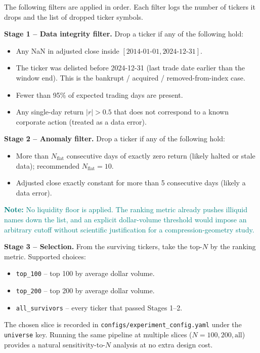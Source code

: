 \documentclass[11pt]{article}
\newcommand{\note}[1]{\textcolor{teal}{\textbf{Note:} #1}}
\begin{document}
The following filters are applied in order. Each filter logs the number of tickers it drops and the list of dropped ticker symbols.

\textbf{Stage 1 -- Data integrity filter.} Drop a ticker if any of the following hold:
\begin{itemize}
    \item Any NaN in adjusted close inside $[2014\text{-}01\text{-}01, 2024\text{-}12\text{-}31]$.
    \item The ticker was delisted before 2024-12-31 (last trade date earlier than the window end). This is the bankrupt / acquired / removed-from-index case.
    \item Fewer than 95\% of expected trading days are present.
    \item Any single-day return $|r| > 0.5$ that does not correspond to a known corporate action (treated as a data error).
\end{itemize}

\textbf{Stage 2 -- Anomaly filter.} Drop a ticker if any of the following hold:
\begin{itemize}
    \item More than $N_{\text{flat}}$ consecutive days of exactly zero return (likely halted or stale data); recommended $N_{\text{flat}} = 10$.
    \item Adjusted close exactly constant for more than 5 consecutive days (likely a data error).
\end{itemize}

\note{No liquidity floor is applied. The ranking metric already pushes illiquid names down the list, and an explicit dollar-volume threshold would impose an arbitrary cutoff without scientific justification for a compression-geometry study.}

\textbf{Stage 3 -- Selection.} From the surviving tickers, take the top-$N$ by the ranking metric. Supported choices:
\begin{itemize}
    \item \texttt{top\_100} -- top 100 by average dollar volume.
    \item \texttt{top\_200} -- top 200 by average dollar volume.
    \item \texttt{all\_survivors} -- every ticker that passed Stages 1--2.
\end{itemize}

The chosen slice is recorded in \texttt{configs/experiment\_config.yaml} under the \texttt{universe} key. Running the same pipeline at multiple slices ($N = 100, 200, \text{all}$) provides a natural sensitivity-to-$N$ analysis at no extra design cost.
\end{document}
